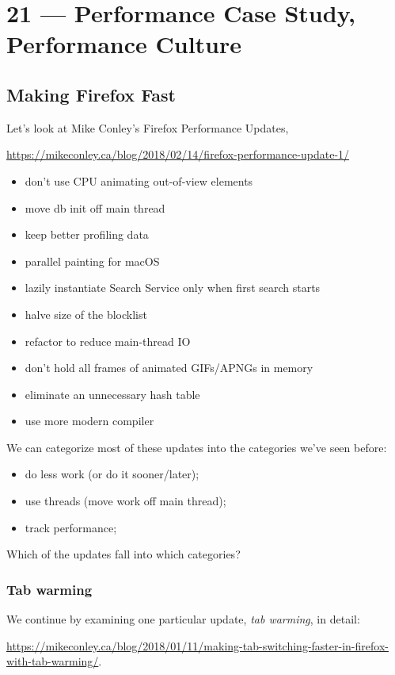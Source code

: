 \documentclass[a4paper]{report}
\begin{document}
\chapter*{21 --- Performance Case Study, Performance Culture}


\section*{Making Firefox Fast}

Let's look at Mike Conley's Firefox Performance Updates,
\begin{center}
{\scriptsize
\vspace*{-1em}
\url{https://mikeconley.ca/blog/2018/02/14/firefox-performance-update-1/}
}
\end{center}
\vspace*{-1em}

\begin{itemize}[noitemsep]
\item don't use CPU animating out-of-view elements
\item move db init off main thread
\item keep better profiling data
\item parallel painting for macOS
\item lazily instantiate Search Service only when first search starts
\item halve size of the blocklist
\item refactor to reduce main-thread IO
\item don't hold all frames of animated GIFs/APNGs in memory
\item eliminate an unnecessary hash table
\item use more modern compiler
\end{itemize}

We can categorize most of these updates into the categories we've seen before:
\begin{itemize}[noitemsep]
\item do less work (or do it sooner/later);
\item use threads (move work off main thread);
\item track performance;
\end{itemize}
Which of the updates fall into which categories?

\subsection*{Tab warming} We continue by examining one particular update, \emph{tab warming}, in detail:
\begin{center}
\scriptsize
\vspace*{-1em}
\url{https://mikeconley.ca/blog/2018/01/11/making-tab-switching-faster-in-firefox-with-tab-warming/}.
\end{center}
\vspace*{-1em}
\end{document}
